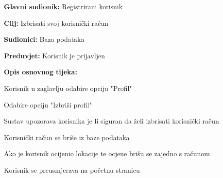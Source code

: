 				\noindent {}
					\begin{packed_item}
	
						\item \textbf{Glavni sudionik: } Registrirani korisnik
						\item \textbf{Cilj:} Izbrisati svoj korisnički račun
						\item \textbf{Sudionici:} Baza podataka
						\item \textbf{Preduvjet:} Korisnik je prijavljen
						\item \textbf{Opis osnovnog tijeka:}
						
						\item[] \begin{packed_enum}
	
							\item Korisnik u zaglavlju odabire opciju "Profil"
							\item Odabire opciju "Izbriši profil"
							\item Sustav upozorava korisnika je li siguran da želi izbrisati korisnički račun
							\item Korisnički račun se briše iz baze podataka
                            \item[] \begin{packed_enum}
                                \item Ako je korisnik ocijenio lokacije te ocjene brišu se zajedno s računom
							\end{packed_enum}
							\item Korisnik se preusmjerava na početnu stranicu
							
						\end{packed_enum}
					\end{packed_item}
			
